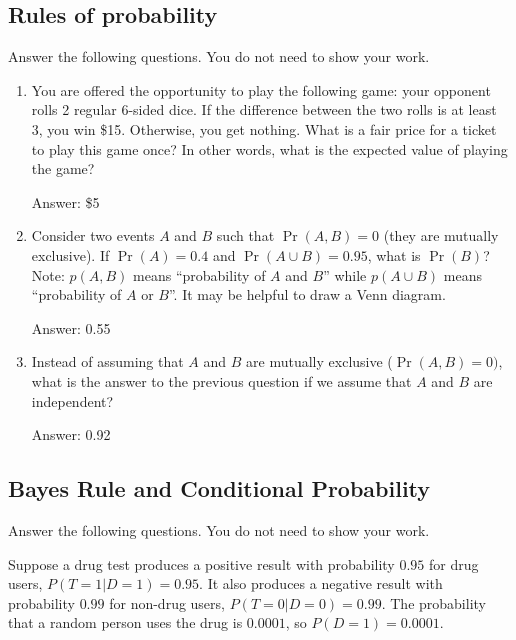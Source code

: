\documentclass{article}
\def\ans#1{\par\gre{Answer: #1}}
\def\blu#1{{\color{blu}#1}}
\def\gre#1{{\color{gre}#1}}
\begin{document}
\subsection{Rules of probability}

\blu{Answer the following questions.} You do not need to show your work.

\begin{enumerate}
\item You are offered the opportunity to play the following game: your opponent rolls 2 regular 6-sided dice. If the difference between the two rolls is at least 3, you win \$15. Otherwise, you get nothing. What is a fair price for a ticket to play this game once? In other words, what is the expected value of playing the game?
\ans{\$5}
\item Consider two events $A$ and $B$ such that $\Pr(A, B)=0$ (they are mutually exclusive). If $\Pr(A) = 0.4$ and $\Pr(A \cup B) = 0.95$, what is $\Pr(B)$? Note: $p(A, B)$ means
``probability of $A$ and $B$'' while $p(A \cup B)$ means ``probability of $A$ or $B$''. It may be helpful to draw a Venn diagram.
\ans{0.55}
\item Instead of assuming that $A$ and $B$ are mutually exclusive ($\Pr(A,B) = 0)$, what is the answer to the previous question if we assume that $A$ and $B$ are independent?
\ans{0.92}
\end{enumerate}

\subsection{Bayes Rule and Conditional Probability}

\blu{Answer the following questions.} You do not need to show your work.

Suppose a drug test produces a positive result with probability $0.95$ for drug users, $P(T=1|D=1)=0.95$. It also produces a negative result with probability $0.99$ for non-drug users, $P(T=0|D=0)=0.99$. The probability that a random person uses the drug is $0.0001$, so $P(D=1)=0.0001$. 
\end{document}

